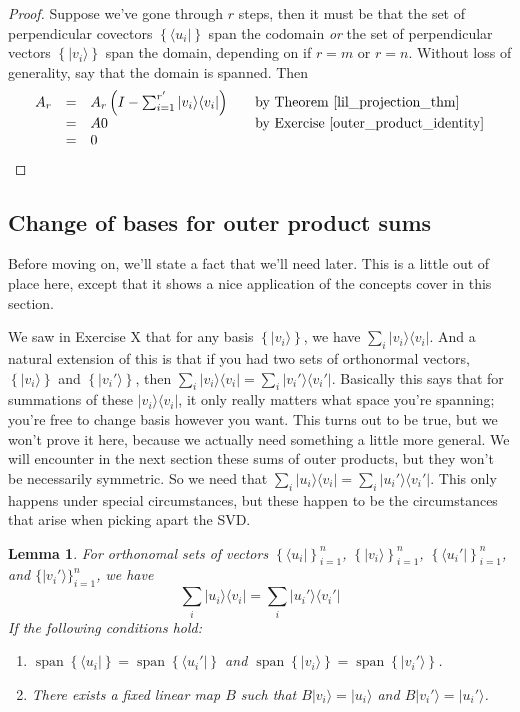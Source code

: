 \documentclass{amsbook}
\newtheorem{lemma}[theorem]{Lemma}
\begin{document}
\begin{proof}
Suppose we've gone through $r$ steps, then it must be that the set of perpendicular covectors $\left\{\langle u _i|\right\}$ span the codomain {\em or} the set of perpendicular vectors $\left\{| v _i\rangle\right\}$ span the domain, depending on if $r=m$ or $r=n$.  Without loss of generality, say that the domain is spanned.  Then 
$$
\begin{array}{rcll}
A_r&=&A_r\left(I-\sum_{i=1}^{r'}| v _i\rangle\langle v _i|\right)&\quad\text{by Theorem \ref{lil_projection_thm}}\\
&=&A0&\quad\text{by Exercise \ref{outer_product_identity}}\\
&=&0&
\end{array}
$$
\end{proof}

\subsection{Change of bases for outer product sums}

Before moving on, we'll state a fact that we'll need later.  This is a little out of place here, except that it shows a nice application of the concepts cover in this section.

We saw in Exercise X that for any basis $\left\{|v_i\rangle\right\}$, we have $\sum_i|v_i\rangle\langle v_i|$.  And a natural extension of this is that if you had two sets of orthonormal vectors, $\left\{|v_i\rangle\right\}$ and $\left\{|v_i'\rangle\right\}$, then $\sum_i|v_i\rangle\langle v_i|=\sum_i|v_i'\rangle\langle v_i'|$.  Basically this says that for summations of these $|v_i\rangle\langle v_i|$, it only really matters what space you're spanning; you're free to change basis however you want.  This turns out to be true, but we won't prove it here, because we actually need something a little more general.  We will encounter in the next section these sums of outer products, but they won't be necessarily symmetric.  So we need that $\sum_i|u_i\rangle\langle v_i|=\sum_i|u_i'\rangle\langle v_i'|$.  This only happens under special circumstances, but these happen to be the circumstances that arise when picking apart the SVD.

\begin{lemma}
\label{rebase_projections}
For orthonomal sets of vectors $\left\{\langle u_i|\right\}_{i=1}^n$, $\left\{|v_i\rangle\right\}_{i=1}^n$, $\left\{\langle u_i'|\right\}_{i=1}^n$, and $\{|v_i'\rangle\}_{i=1}^n$, we have
$$
\sum_i|u_i\rangle\langle v_i|=\sum_i|u_i'\rangle\langle v_i'|
$$
If the following conditions hold:
\begin{enumerate}
\item $\operatorname{span}\left\{\langle u_i|\right\}=\operatorname{span}\left\{\langle u_i'|\right\}$ and $\operatorname{span}\left\{|v_i\rangle\right\}=\operatorname{span}\left\{|v_i'\rangle\right\}$.
\item There exists a fixed linear map $B$ such that $B|v_i\rangle=|u_i\rangle$ and $B|v_i'\rangle=|u_i'\rangle$.
\end{enumerate}
\end{lemma}
\end{document}
